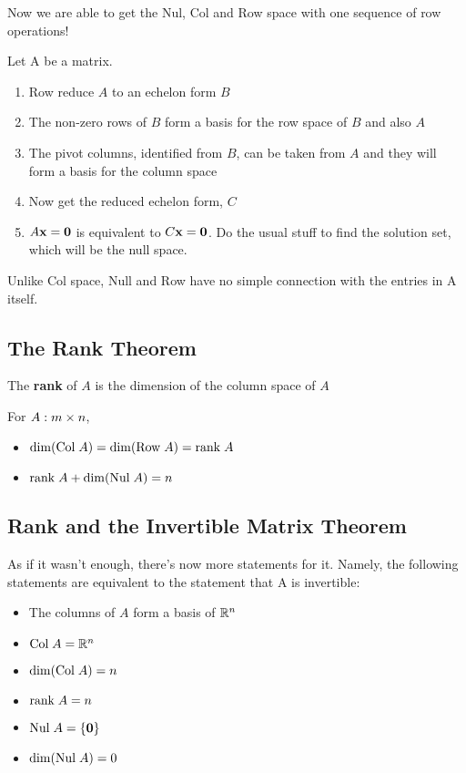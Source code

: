 \documentclass{report}
\begin{document}
Now we are able to get the Nul, Col and Row space with one sequence of row operations!
\begin{tcolorbox}[colback=blue!5!white, colframe=blue!75!black, title=Getting the trio]
Let A be a matrix.
\begin{enumerate}
    \item Row reduce $A$ to an echelon form $B$
    \item The non-zero rows of $B$ form a basis for the row space of $B$ and also $A$
    \item The pivot columns, identified from $B$, can be taken from $A$ and they will 
    form a basis for the column space
    \item Now get the reduced echelon form, $C$
    \item $A\mathbf{x} = \mathbf{0}$ is equivalent to $C\mathbf{x} = \mathbf{0}$. Do the usual stuff to find the 
    solution set, which will be the null space.
\end{enumerate}
Unlike Col space, Null and Row have no simple connection with the entries in A itself.
\end{tcolorbox}

\subsection{The Rank Theorem}
\begin{definition}
    The \textbf{rank} of $A$ is the dimension of the column space of $A$
\end{definition}

\begin{theorem}
    For $A: m \times n$, 
    \begin{itemize}
        \item $\dim (\mathrm{Col}\; A) = \dim (\mathrm{Row}\; A) = \mathrm{rank}\; A$
        \item $\mathrm{rank}\; A + \dim (\mathrm{Nul}\; A) = n$
    \end{itemize}
\end{theorem}

\subsection{Rank and the Invertible Matrix Theorem}
As if it wasn't enough, there's now more statements for it.
Namely, the following statements are equivalent to the statement that A is invertible:
\begin{itemize}
    \item The columns of $A$ form a basis of $\mathbb{R}^n$
    \item $\mathrm{Col}\; A = \mathbb{R}^n$
    \item $\dim (\mathrm{Col}\; A) = n$
    \item $\mathrm{rank}\; A = n$
    \item $\mathrm{Nul}\; A = \{\mathbf{0}\}$
    \item $\dim (\mathrm{Nul}\; A) = 0$
\end{itemize}
\end{document}
